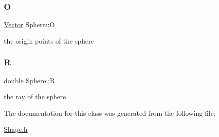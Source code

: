 \subsubsection{\texorpdfstring{O}{O}}
{\footnotesize\ttfamily \hyperlink{classVector}{Vector} Sphere\+::O}

the origin points of the sphere \mbox{\label{classSphere_ae63beb5380ccbbb9ba820c54d03d02ef}} 
\subsubsection{\texorpdfstring{R}{R}}
{\footnotesize\ttfamily double Sphere\+::R}

the ray of the sphere 

The documentation for this class was generated from the following file\+:\begin{DoxyCompactItemize}
\item 
\hyperlink{Shape_8h}{Shape.\+h}\end{DoxyCompactItemize}
